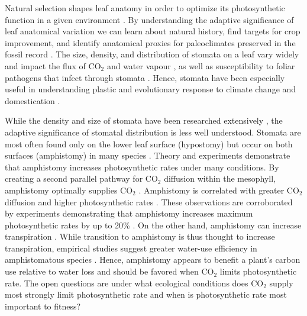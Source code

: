 \documentclass[12pt, oneside]{article}
\begin{document}
Natural selection shapes leaf anatomy in order to optimize its photosynthetic function in a given environment \citep{Haberlandt_1914, Givnish_1987, Smith_etal_1997}. By understanding the adaptive significance of leaf anatomical variation we can learn about natural history, find targets for crop improvement, and identify anatomical proxies for paleoclimates preserved in the fossil record \citep[e.g.][]{Wolfe_1971, Royer_2001, McElwain_Steinthorsdottir_2017}. The size, density, and distribution of stomata on a leaf vary widely and impact the flux of CO$_2$ and water vapour \citep[recently reviewed in][]{Sack_Buckley_2016}, as well as susceptibility to foliar pathogens that infect through stomata \citep{Mckown_etal_2014, Melotto_etal_2017}. Hence, stomata have been especially useful in understanding plastic and evolutionary response to climate change and domestication \citep{Woodward_1987, Beerling_Royer_2011, Milla_etal_2013}.

While the density and size of stomata have been researched extensively \citep[and references therein]{Sack_Buckley_2016}, the adaptive significance of stomatal distribution is less well understood. Stomata are most often found only on the lower leaf surface (hypostomy) but occur on both surfaces (amphistomy) in many species \citep{Metcalfe_Chalk_1950, Parkhurst_1978, Mott_etal_1982}. Theory and experiments demonstrate that amphistomy increases photosynthetic rates under many conditions. By creating a second parallel pathway for CO$_2$ diffusion within the mesophyll, amphistomy optimally supplies CO$_2$ \citep{Parkhurst_1978, Gutschick_1984b, Jones_1985}. Amphistomy is correlated with greater CO$_2$ diffusion \citep{Beerling_Kelly_1996} and higher photosynthetic rates \citep{Mckown_etal_2014}. These observations are corroborated by experiments demonstrating that amphistomy increases maximum photosynthetic rates by up to 20\% \citep{Parkhurst_Mott_1990}. On the other hand, amphistomy can increase transpiration \citep{Jones_1985, Foster_Smith_1986, Buckley_etal_2015}. While transition to amphistomy is thus thought to increase transpiration, empirical studies suggest greater water-use efficiency in amphistomatous species \citep{Bucher_etal_2017}. Hence, amphistomy appears to benefit a plant's carbon use relative to water loss and should be favored when CO$_2$ limits photosynthetic rate. The open questions are under what ecological conditions does CO$_2$ supply most strongly limit photosynthetic rate \citep{Peat_Fitter_1994b} and when is photosynthetic rate most important to fitness?
\end{document}
